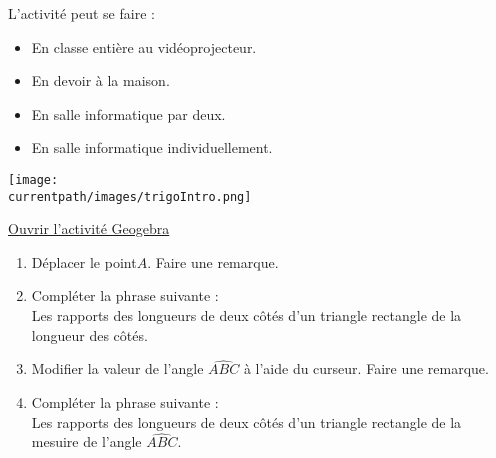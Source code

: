 \begin{changemargin}{-10mm}{-10mm}
\begin{activite}
    \begin{minipage}{0.6\linewidth}
        \begin{remarque}
            L'activité peut se faire :
            \begin{itemize}
                \item En classe entière au vidéoprojecteur.
                \item En devoir à la maison.
                \item En salle informatique par deux.
                \item En salle informatique individuellement.
            \end{itemize}
        \end{remarque}
    \end{minipage}
    \begin{minipage}{0.35\linewidth}
        \begin{center}
            \texttt{[image: \\currentpath/images/trigoIntro.png]}
        \end{center}
    \end{minipage}
    \begin{center}
        {\Huge \href{https://www.geogebra.org/m/ed8skenp}{ Ouvrir l'activité Geogebra}}    
    \end{center}
    \begin{enumerate}
        \item Déplacer le point$A$. Faire une remarque.\par\dotfill\par\dotfill\par\dotfill\par\dotfill
        \item Compléter la phrase suivante :\\
        Les rapports des longueurs de deux côtés d'un triangle rectangle \makebox[0.3\linewidth]{\dotfill} de la longueur des côtés.
        \item Modifier la valeur de l'angle $\widehat{ABC}$ à l'aide du curseur. Faire une remarque.\par\dotfill\par\dotfill\par\dotfill\par\dotfill
        \item Compléter la phrase suivante :\\
        Les rapports des longueurs de deux côtés d'un triangle rectangle \makebox[0.3\linewidth]{\dotfill} de la mesuire de l'angle $\widehat{ABC}$.
    \end{enumerate}


\end{activite}
\end{changemargin}
